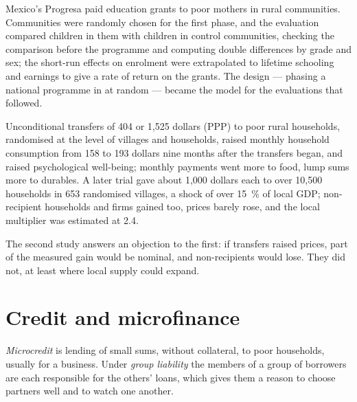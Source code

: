 \begin{record}[Progresa, 1997]
Mexico's Progresa paid education grants to poor mothers in rural communities.
Communities were randomly chosen for the first phase, and the evaluation compared
children in them with children in control communities, checking the comparison
before the programme and computing double differences by grade and sex; the
short-run effects on enrolment were extrapolated to lifetime schooling and earnings
to give a rate of return on the grants. %
The design --- phasing a national programme in at random --- became the model for
the evaluations that followed.
\end{record}

\begin{record}
Unconditional transfers of 404 or 1{,}525 dollars (PPP) to poor rural households, randomised at the level of
villages and households, raised monthly household consumption from 158 to 193 dollars nine months after the
transfers began, and raised psychological well-being; monthly payments went more to
food, lump sums more to durables. %
A later trial gave about 1{,}000 dollars each to over 10,500 households in 653 randomised villages, a shock of over 15~\%
of local GDP; non-recipient households and firms gained too, prices barely rose, and the
local multiplier was estimated at 2.4. %
\end{record}

The second study answers an objection to the first: if transfers raised prices,
part of the measured gain would be nominal, and non-recipients would lose. They did
not, at least where local supply could expand.

\section{Credit and microfinance}\label{sec:b3:development-microeconomics:credit}

\begin{definition}\label{def:b3:development-microeconomics:microcredit}
\emph{Microcredit} is lending of small sums, without collateral, to poor households,
usually for a business. Under \emph{group liability} the members of a group of
borrowers are each responsible for the others' loans, which gives them a reason to
choose partners well and to watch one another.
\end{definition}


